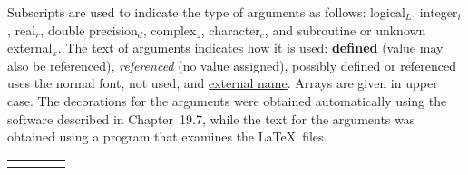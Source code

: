 \documentclass[twoside]{MATH77}
\begin{document}
\newcommand{\s}{\hspace{1.2pt}}
\normalem
\begindex
Subscripts are used to indicate the type of arguments as follows:
logical$_L$, integer$_i$, real$_r$, double precision$_d$, complex$_z$,
character$_c$, and subroutine or unknown external$_x$.  The text of
arguments indicates how it is used: {\bf defined} (value may also be
referenced), {\em referenced} (no value assigned), possibly defined or
referenced uses the normal font, {\scriptsize not used}, and
\uline{external name}.  Arrays are given in upper case.  The decorations
for the arguments were obtained automatically using the software described
in Chapter~19.7, while the text for the arguments was obtained using a
program that examines the \LaTeX \ files.

\begin{supertabular}{@{\qquad \quad}r@{\quad }l@{\ \ }l@{\ }p{4.9in}}
\shrinkheight{.175in}

\end{supertabular}
\end{document}
